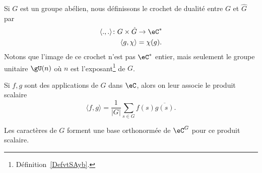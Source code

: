 Si \( G\) est un groupe abélien, nous définissons le crochet de dualité entre \( G\) et \( \hat G\) par
\begin{equation}
	\begin{aligned}
		\langle ., .\rangle \colon G\times \hat G & \to \eC^* \\
		\langle g, \chi\rangle                    & =\chi(g).
	\end{aligned}
\end{equation}
Notons que l'image de ce crochet n'est pas \( \eC^*\) entier, mais seulement le groupe unitaire \( \gU(n)\) où \( n\) est l'exposant\footnote{Définition~\ref{DefvtSAyb}.} de \( G\).


Si \( f,g\) sont des applications de \( G\) dans \( \eC\), alors on leur associe le produit scalaire
\begin{equation}
	\langle f, g\rangle =\frac{1}{ | G | }\sum_{s\in G}f(s)\overline{ g(s) }.
\end{equation}

\begin{lemma}		\label{LEMooCSTVooJfhzEU}
	Les caractères de \( G\) forment une base orthonormée de \( \eC^G\) pour ce produit scalaire.
\end{lemma}


